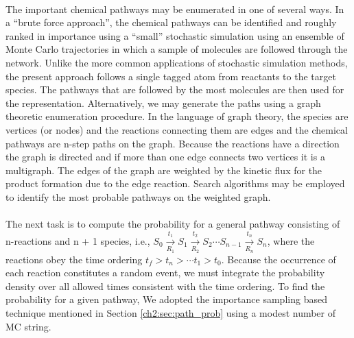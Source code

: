 \paragraph{}
The important chemical pathways may be enumerated in one
of several ways. In a “brute force approach”, the chemical
pathways can be identified and roughly ranked in importance
using a “small” stochastic simulation using an ensemble of
Monte Carlo trajectories in which a sample of molecules are
followed through the network. Unlike the more common
applications of stochastic simulation methods, the present
approach follows a single tagged atom from reactants to the
target species.\cite{ch1_IRPC_34_mcquarrie1967stochastic,ch1_IRPC_35_gillespie1976general,ch1_IRPC_37_gibson2000efficient,ch1_IRPC_36_gillespie2013perspective} The pathways that are followed by the most molecules are then used for the representation. Alternatively,
we may generate the paths using a graph theoretic enumeration procedure. In the language of graph theory, the species are
vertices (or nodes) and the reactions connecting them are
edges and the chemical pathways are n-step paths on the graph.
Because the reactions have a direction the graph is directed and
if more than one edge connects two vertices it is a multigraph.
The edges of the graph are weighted by the kinetic flux for the
product formation due to the edge reaction. Search algorithms
may be employed to identify the most probable pathways on
the weighted graph.
\newline
\paragraph{}
The next task is to compute the probability for a general
pathway consisting of n-reactions and n + 1 species, i.e., $S_{0} \xrightarrow[R_1]{t_1} S_1\xrightarrow[R_2]{t_2} S_2 \cdots  S_{n-1} \xrightarrow[R_n]{t_n} S_n$, where the reactions obey the time ordering $t_f > t_n > \cdots t_1 > t_0$. Because the occurrence of each reaction constitutes a random event, we must integrate the probability
density over all allowed times consistent with the time ordering.
To find the probability for a given pathway, We adopted the importance sampling based technique mentioned in Section \ref{ch2:sec:path_prob} using a modest number of MC string.
\newline
